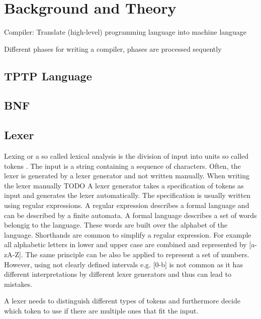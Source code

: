 
\chapter{Background and Theory}\label{cha:Background}
\cite{Mogensen.2017}
Compiler: Translate (high-level) programming language into machine language

Different phases for writing a compiler, phases are processed sequently
\section{TPTP Language}\label{sec:BackgroundTPTP}
\cite{Sut17}

\section{\acf{BNF}}\label{sec:BackgroundBNF}

\section{Lexer}\label{sec:BackgroundLexer}

Lexing or a so called lexical analysis is the division of input into units so called tokens \cite{LexYacc.1992}. 
The input is a string containing a sequence of characters. 
Often, the lexer is generated by a lexer generator and not written manually. When writing the lexer manually TODO
A lexer generator takes a specification of tokens as input and generates the lexer automatically. 
The specification is usually written using regular expressions. 
A regular expression describes a formal language and can be described by a finite automata.
A formal language describes a set of words belongig to the language. These words are built over the alphabet of the language.
Shorthands are common to simplify a regular expression. For example all alphabetic letters in lower and upper case are combined and represented by [a-zA-Z]. The same principle can be also be applied to represent a set of numbers. However, using not clearly defined intervals e.g. [0-b] is not common as it has different interpretations by different lexer generators and thus can lead to mistakes. \cite{Mogensen.2017}

A lexer needs to distinguish different types of tokens and furthermore decide which token to use if there are multiple ones that fit the input. \cite{Mogensen.2017}

